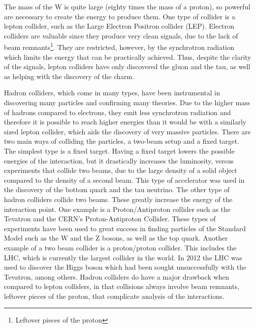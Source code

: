 The mass of the W is quite large (eighty times the mass of a proton), so powerful are necessary to create the energy to produce them. One type of collider is a lepton collider, such as the Large Electron Positron collider (LEP). Electron colliders are valuable since they produce very clean signals, due to the lack of beam remnants\footnote{Leftover pieces of the proton}. They are restricted, however, by the synchrotron radiation which limits the energy that can be practically achieved. Thus, despite the clarity of the signals, lepton colliders have only discovered the gluon and the tau, as well as helping with the discovery of the charm\cite{TauHistory}\cite{GluonHist}. \par
	Hadron colliders, which come in many types, have been instrumental in discovering many particles and confirming many theories. Due to the higher mass of hadrons compared to electrons, they emit less synchrotron radiation and therefore it is possible to reach higher energies than it would be with a similarly sized lepton collider, which aids the discovery of very massive particles. There are two main ways of  colliding the particles, a two-beam setup and a fixed target. The simplest type is a fixed target. Having a fixed target lowers the possible energies of the interaction, but it drastically increases the luminosity, versus experiments that collide two beams, due to the large density of a solid object compared to the density of a second beam. This type of accelerator was used in the discovery of the bottom quark and the tau neutrino. The other type of hadron colliders collide two beams. These greatly increase the energy of the interaction point. One example is a Proton/Antiproton collider such as the Tevatron and the CERN's Proton-Antiproton Collider. These types of experiments have been used to great success in finding particles of the Standard Model such as the W and the Z bosons, as well as the top quark\cite{ZBosonDiscovery}\cite{Wdiscovery}\cite{WdiscoveryCont}\cite{TopDiscovery}. Another example of a two beam collider is a proton/proton collider. This includes the LHC, which is currently the largest collider in the world. In 2012 the LHC was used to discover the Higgs boson \cite{CMSHiggsPaper} which had been sought unsuccessfully with the Tevatron, among others. Hadron colliders do have a major drawback when compared to lepton colliders, in that collisions always involve beam remnants, leftover pieces of the proton, that complicate analysis of the interactions.\par
    

